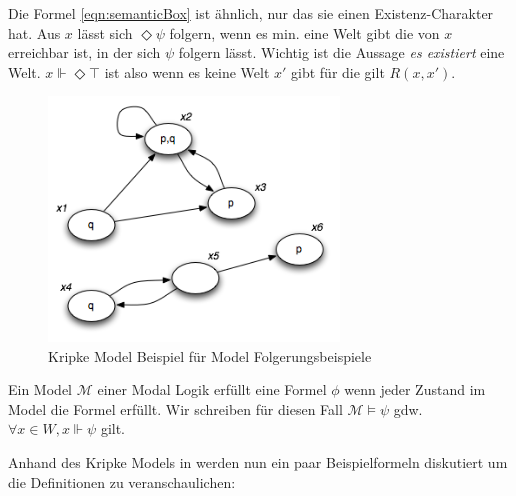 Die Formel \eqref{eqn:semanticBox} ist ähnlich, nur das sie einen Existenz-Charakter hat. 
Aus $x$ lässt sich $\Diamond \psi$ folgern, wenn es min. eine Welt gibt die von $x$ erreichbar ist, in der sich $\psi$ folgern lässt. 
Wichtig ist die Aussage \emph{es existiert} eine Welt. 
$x \Vdash \Diamond \top$ ist also \false wenn es keine Welt $x'$ gibt für die gilt $R(x,x')$.\\


\begin{figure}[h!]
	\centering
	\includegraphics[height=6.5cm]{Images/Kripke01.png}
	\caption{Kripke Model Beispiel für Model Folgerungsbeispiele}
	\label{fig:Kripke01}
\end{figure}


\begin{definition}
	\label{def:model_erfuellt}
	Ein Model $\mathcal{M}$ einer Modal Logik erfüllt eine Formel $\phi$ wenn jeder Zustand im Model die Formel erfüllt.
	Wir schreiben für diesen Fall $\mathcal{M} \vDash \psi$ gdw. $\forall x \in W, x \Vdash \psi$ gilt. \cite[S.310f]{huth2004logic}\\
\end{definition}
%
%
Anhand des Kripke Models in  werden nun ein paar Beispielformeln diskutiert um die Definitionen zu veranschaulichen:

